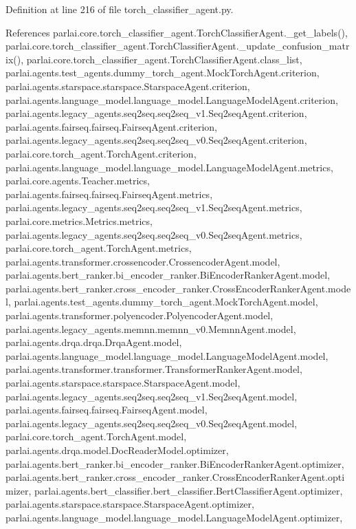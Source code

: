Definition at line 216 of file torch\+\_\+classifier\+\_\+agent.\+py.



References parlai.\+core.\+torch\+\_\+classifier\+\_\+agent.\+Torch\+Classifier\+Agent.\+\_\+get\+\_\+labels(), parlai.\+core.\+torch\+\_\+classifier\+\_\+agent.\+Torch\+Classifier\+Agent.\+\_\+update\+\_\+confusion\+\_\+matrix(), parlai.\+core.\+torch\+\_\+classifier\+\_\+agent.\+Torch\+Classifier\+Agent.\+class\+\_\+list, parlai.\+agents.\+test\+\_\+agents.\+dummy\+\_\+torch\+\_\+agent.\+Mock\+Torch\+Agent.\+criterion, parlai.\+agents.\+starspace.\+starspace.\+Starspace\+Agent.\+criterion, parlai.\+agents.\+language\+\_\+model.\+language\+\_\+model.\+Language\+Model\+Agent.\+criterion, parlai.\+agents.\+legacy\+\_\+agents.\+seq2seq.\+seq2seq\+\_\+v1.\+Seq2seq\+Agent.\+criterion, parlai.\+agents.\+fairseq.\+fairseq.\+Fairseq\+Agent.\+criterion, parlai.\+agents.\+legacy\+\_\+agents.\+seq2seq.\+seq2seq\+\_\+v0.\+Seq2seq\+Agent.\+criterion, parlai.\+core.\+torch\+\_\+agent.\+Torch\+Agent.\+criterion, parlai.\+agents.\+language\+\_\+model.\+language\+\_\+model.\+Language\+Model\+Agent.\+metrics, parlai.\+core.\+agents.\+Teacher.\+metrics, parlai.\+agents.\+fairseq.\+fairseq.\+Fairseq\+Agent.\+metrics, parlai.\+agents.\+legacy\+\_\+agents.\+seq2seq.\+seq2seq\+\_\+v1.\+Seq2seq\+Agent.\+metrics, parlai.\+core.\+metrics.\+Metrics.\+metrics, parlai.\+agents.\+legacy\+\_\+agents.\+seq2seq.\+seq2seq\+\_\+v0.\+Seq2seq\+Agent.\+metrics, parlai.\+core.\+torch\+\_\+agent.\+Torch\+Agent.\+metrics, parlai.\+agents.\+transformer.\+crossencoder.\+Crossencoder\+Agent.\+model, parlai.\+agents.\+bert\+\_\+ranker.\+bi\+\_\+encoder\+\_\+ranker.\+Bi\+Encoder\+Ranker\+Agent.\+model, parlai.\+agents.\+bert\+\_\+ranker.\+cross\+\_\+encoder\+\_\+ranker.\+Cross\+Encoder\+Ranker\+Agent.\+model, parlai.\+agents.\+test\+\_\+agents.\+dummy\+\_\+torch\+\_\+agent.\+Mock\+Torch\+Agent.\+model, parlai.\+agents.\+transformer.\+polyencoder.\+Polyencoder\+Agent.\+model, parlai.\+agents.\+legacy\+\_\+agents.\+memnn.\+memnn\+\_\+v0.\+Memnn\+Agent.\+model, parlai.\+agents.\+drqa.\+drqa.\+Drqa\+Agent.\+model, parlai.\+agents.\+language\+\_\+model.\+language\+\_\+model.\+Language\+Model\+Agent.\+model, parlai.\+agents.\+transformer.\+transformer.\+Transformer\+Ranker\+Agent.\+model, parlai.\+agents.\+starspace.\+starspace.\+Starspace\+Agent.\+model, parlai.\+agents.\+legacy\+\_\+agents.\+seq2seq.\+seq2seq\+\_\+v1.\+Seq2seq\+Agent.\+model, parlai.\+agents.\+fairseq.\+fairseq.\+Fairseq\+Agent.\+model, parlai.\+agents.\+legacy\+\_\+agents.\+seq2seq.\+seq2seq\+\_\+v0.\+Seq2seq\+Agent.\+model, parlai.\+core.\+torch\+\_\+agent.\+Torch\+Agent.\+model, parlai.\+agents.\+drqa.\+model.\+Doc\+Reader\+Model.\+optimizer, parlai.\+agents.\+bert\+\_\+ranker.\+bi\+\_\+encoder\+\_\+ranker.\+Bi\+Encoder\+Ranker\+Agent.\+optimizer, parlai.\+agents.\+bert\+\_\+ranker.\+cross\+\_\+encoder\+\_\+ranker.\+Cross\+Encoder\+Ranker\+Agent.\+optimizer, parlai.\+agents.\+bert\+\_\+classifier.\+bert\+\_\+classifier.\+Bert\+Classifier\+Agent.\+optimizer, parlai.\+agents.\+starspace.\+starspace.\+Starspace\+Agent.\+optimizer, parlai.\+agents.\+language\+\_\+model.\+language\+\_\+model.\+Language\+Model\+Agent.\+optimizer, 